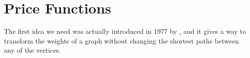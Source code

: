 \documentclass[11pt]{article}
\begin{document}






\section{Price Functions}
\label{sec:price}
The first idea we need was actually introduced in 1977 by \cite{Johnson77}, and it gives a way to transform the weights of a graph
without changing the shortest paths between any of the vertices.
\end{document}
